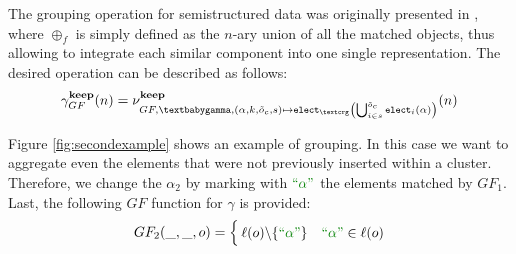 The grouping operation for semistructured data  was originally presented in \cite{Magnani06}, where  $\oplus_f$ is simply defined as the $n$-ary union of all the matched objects, thus allowing to integrate each similar component into one single representation. The desired operation can be described as follows: 
\begin{equation}\label{eq:grouping}
\gamma_{GF}^{\textbf{keep}}(n)=\nu^{\textbf{keep}}_{GF,\genp,(\alpha,k,\tilde{o}_{c},s)\mapsto \texttt{elect}_{\ngraph}\left(\bigcup^{\tilde{o}_c}_{i\in s}\texttt{elect}_i(\alpha)\right)}(n)
\end{equation}
\begin{example}[continues=ex:aggregations,label=ex:aggregations2]
Figure \ref{fig:secondexample} shows an example of grouping. In this case we want to aggregate even the elements that were not previously inserted within a cluster. Therefore, we change the $\alpha_2$ by marking with $\hstr{\alpha}$ the elements matched by $GF_1$.
Last, the following $GF$ function for $\gamma$ is provided:
\[GF_2(\_,\_,o)=\begin{cases}
\ell(o)\backslash\{\hstr{\alpha}\} & \hstr{\alpha}\in\ell(o)\\

\end{cases}\]
\end{example}
